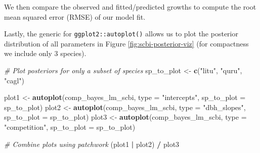 \documentclass[12pt]{article}
\newenvironment{Shaded}{\begin{snugshade}}{\end{snugshade}}
\newcommand{\CommentTok}[1]{\textcolor[rgb]{0.56,0.35,0.01}{\textit{#1}}}
\newcommand{\DataTypeTok}[1]{\textcolor[rgb]{0.13,0.29,0.53}{#1}}
\newcommand{\KeywordTok}[1]{\textcolor[rgb]{0.13,0.29,0.53}{\textbf{#1}}}
\newcommand{\NormalTok}[1]{#1}
\newcommand{\OperatorTok}[1]{\textcolor[rgb]{0.81,0.36,0.00}{\textbf{#1}}}
\newcommand{\StringTok}[1]{\textcolor[rgb]{0.31,0.60,0.02}{#1}}
\begin{document}
\begin{Shaded}
\end{Shaded}

We then compare the observed and fitted/predicted growths to compute the
root mean squared error (RMSE) of our model fit.

\begin{Shaded}
\end{Shaded}

Lastly, the generic for \texttt{ggplot2::autoplot()} allows us to plot
the posterior distribution of all parameters in Figure
\ref{fig:scbi-posterior-viz} (for compactness we include only 3
species).

\begin{Shaded}
\begin{Highlighting}[]
\CommentTok{# Plot posteriors for only a subset of species}
\NormalTok{sp_to_plot <-}\StringTok{ }\KeywordTok{c}\NormalTok{(}\StringTok{"litu"}\NormalTok{, }\StringTok{"quru"}\NormalTok{, }\StringTok{"cagl"}\NormalTok{)}

\NormalTok{plot1 <-}\StringTok{ }\KeywordTok{autoplot}\NormalTok{(comp_bayes_lm_scbi, }\DataTypeTok{type =} \StringTok{"intercepts"}\NormalTok{, }
                  \DataTypeTok{sp_to_plot =}\NormalTok{ sp_to_plot)}
\NormalTok{plot2 <-}\StringTok{ }\KeywordTok{autoplot}\NormalTok{(comp_bayes_lm_scbi, }\DataTypeTok{type =} \StringTok{"dbh_slopes"}\NormalTok{, }
                  \DataTypeTok{sp_to_plot =}\NormalTok{ sp_to_plot)}
\NormalTok{plot3 <-}\StringTok{ }\KeywordTok{autoplot}\NormalTok{(comp_bayes_lm_scbi, }\DataTypeTok{type =} \StringTok{"competition"}\NormalTok{, }
                  \DataTypeTok{sp_to_plot =}\NormalTok{ sp_to_plot)}

\CommentTok{# Combine plots using patchwork}
\NormalTok{(plot1 }\OperatorTok{|}\StringTok{ }\NormalTok{plot2) }\OperatorTok{/}\StringTok{ }\NormalTok{plot3}
\end{Highlighting}
\end{Shaded}
\end{document}

